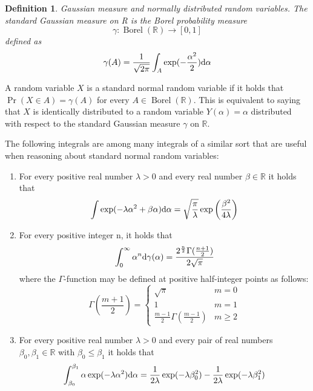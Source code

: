 \documentclass[aps,pra,onecolumn,notitlepage,superscriptaddress]{revtex4-1}
\newcommand{\R}{\mathbb{R}}
\def\d{{\rm d}}
\newcommand{\op}[1]{\operatorname{#1}}
\newtheorem{defi}{Definition}
\begin{document}
    \begin{defi}
        Gaussian measure and normally distributed random variables. The standard Gaussian measure on R is the Borel probability measure
        \begin{equation}
            \gamma : \op{Borel}(\R) \to [0,1]
        \end{equation}
        defined as
        \begin{equation}
            \gamma(A) = \frac{1}{\sqrt{2\pi}} \int_A \exp(-\frac{\alpha^2}{2}) \d \alpha
        \end{equation}
    \end{defi}

    A random variable $X$ is a standard normal random variable if it holds that $\op{Pr}(X \in A) = \gamma(A)$ for every $A \in \op{Borel}(\R)$. This is equivalent to saying that $X$ is identically distributed to a random variable $Y(\alpha) = \alpha$ distributed with respect to the standard Gaussian measure $\gamma$ on $\R$.

    The following integrals are among many integrals of a similar sort that are useful when reasoning about standard normal random variables:
    \begin{enumerate}
        \item  For every positive real number $\lambda > 0$ and every real number $\beta \in \R$ it holds that
        \begin{equation}
            \int \exp( -\lambda \alpha^2 + \beta \alpha ) \d \alpha = \sqrt{\frac{\pi}{\lambda}} \exp \left(\frac{\beta^2}{4 \lambda} \right)
        \end{equation}
        \item  For every positive integer n, it holds that
        \begin{equation}
            \int_0^\infty \alpha^n \d \gamma(\alpha) = \frac{2^{\frac{n}{2}} \Gamma(\frac{n+1}{2}) }{ 2\sqrt{\pi} }
        \end{equation}
        where the $\Gamma$-function may be defined at positive half-integer points as follows:
        \begin{equation}
            \Gamma \left( \frac{m+1}{2} \right) = \begin{cases}
                \sqrt{\pi} & m = 0 \\
                1 & m = 1 \\
                \frac{m-1}{2} \Gamma(\frac{m-1}{2}) & m \geq 2
            \end{cases}
        \end{equation}

        \item For every positive real number $\lambda > 0$ and every pair of real numbers $β_0, β_1 \in \R$ with $\beta_0 \leq \beta_1$ it holds that
        \begin{equation}
            \int_{\beta_0}^{\beta_1} \alpha \exp(-\lambda \alpha^2) \d \alpha = \frac{1}{2\lambda} \exp(-\lambda \beta_0^2) - \frac{1}{2\lambda} \exp(-\lambda \beta_1^2)
        \end{equation}
    \end{enumerate}
\end{document}
